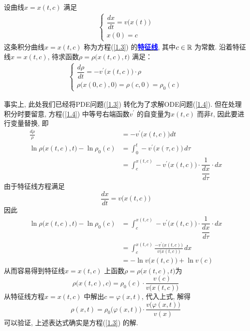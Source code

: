 	\begin{defn}\label{def 1.1.2}
		设曲线$x = x(t , c)$ 满足
		\begin{align*}
			\begin{cases}
				\dfrac{dx}{dt} = v\Big( x(t) \Big) \\
				x(0) =c
			\end{cases}
		\end{align*}
		这条积分曲线$x = x(t , c)$ 称为方程(\ref{1.3}) 的\underline{\textcolor{blue}{\textbf{特征线}}}, 其中$c \in \mathbb{R}$ 为常数. 沿着特征线$x = x(t , c)$, 待求函数$\rho = \rho\Big( x(t , c) , t \Big)$ 满足：
		\begin{align}
			\begin{cases}
				\dfrac{d \rho}{dt} = - v^{'}\Big( x(t , c) \Big) \cdot \rho \\
				\rho \Big( x(0 , c) , 0 \Big) = \rho(c , 0) = \rho_0(c)
			\end{cases}\label{1.4}
		\end{align}
		
		\vspace*{2em}
		
		\begin{rmk}
			 事实上, 此处我们已经将PDE问题(\ref{1.3}) 转化为了求解ODE问题(\ref{1.4}). 但在处理积分时要留意, 方程(\ref{1.4}) 中等号右端函数$v^{'}$ 的自变量为$x(t , c)$ 而非$t$, 因此要进行变量替换, 即
			 \begin{align*}
			 	\frac{d \rho}{\rho} &= - v^{'} \Big( x(t , c) \Big) dt \\
			 	\ln \rho \Big( x(t , c) , t \Big) - \ln \rho_0(c) &= \int_{0}^t - v^{'} \Big( x(\tau , c) \Big) \, d\tau \\
			 	&= \int_{c}^{x(t , c)} - v^{'} \Big( x(t , c) \Big) \cdot \dfrac{1}{\dfrac{dx}{d\tau}} \cdot dx
			 \end{align*}
		 	由于特征线方程满足
		 	\[ \frac{dx}{dt} = v \Big( x(t , c) \Big) \]
		 	因此
		 	\begin{align*}
		 		\ln \rho \Big( x(t , c) , t \Big) - \ln \rho_0(c) 
		 		&= \int_{c}^{x(t , c)} - v^{'} \Big( x(t , c) \Big) \cdot \dfrac{1}{\dfrac{dx}{d\tau}} \cdot dx \\
		 		&= \int_{c}^{x(t , c)} \frac{- v^{'} \Big( x(t , c) \Big)}{v \Big( x(t , c) \Big)} \, dx \\
		 		&= -\ln v \Big( x(t , c) \Big) + \ln v(c)
		 	\end{align*}
	 		从而容易得到特征线$x = x(t , c)$ 上函数$\rho = \rho\Big( x(t , c) , t \Big)$为
	 		\[ \rho\Big( x(t , c) , c \Big) = \rho_0(c) \cdot \frac{v(c)}{v \Big( x(t , c) \Big)}\]
	 		从特征线方程$x = x(t , c)$ 中解出$c = \varphi(x , t)$, 代入上式, 解得
	 		\[ \rho(x , t) = \rho_0\Big( \varphi(x , t) \Big) \cdot \frac{v \Big( \varphi(x , t) \Big)}{v(x)} \]
	 		可以验证, 上述表达式确实是方程(\ref{1.3}) 的解. 
		\end{rmk}
	\end{defn}

